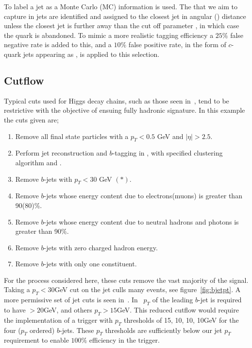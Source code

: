 To label a jet as a  Monte Carlo (MC) information is used.
The  that we aim to capture in jets are identified and
assigned to the closest jet in angular (\distancedeltar{}) distance
unless the closest jet is further away than the cut off parameter \stoppingdeltar{},
in which case the quark is abandoned.
To mimic a more realistic tagging efficiency a
\(25\%\) false negative rate is added to this,
and a \(10\%\) false positive rate, in the form of \(c\)-quark
jets appearing as , is applied to this selection.

\subsection{Cutflow}\label{sec:cutflow}

Typical cuts used for Higgs decay chains,
such as those seen in~\cite{Sirunyan2018alljet},
tend to be restrictive with the objective of 
ensuing fully hadronic signature. 
In this example the cuts given are;
\begin{enumerate}
    \item Remove all final state particles with a $p_T < 0.5$ GeV and $|\eta| > 2.5$.
    \item Perform jet reconstruction and $b$-tagging in \fastjet{} \cite{Cacciari2011FastJet}, with specified clustering algorithm and \stoppingdeltar{}.
    \item Remove $b$-jets with $p_T < 30$ GeV $(*)$.
    \item Remove $b$-jets whose energy content due to electrons(muons) is greater than  90(80)\%.
    \item Remove $b$-jets whose energy content due to neutral hadrons and photons is greater than 90\%.
    \item Remove $b$-jets with zero charged hadron energy.
    \item Remove $b$-jets with only one constituent.
\end{enumerate}

For the process considered here, 
these cuts remove the vast majority of the signal.
Taking a \(p_T < 30\)GeV cut on the jet culls many events,
see figure~\ref{fig:bjetpt}.
A more permissive set of jet cuts is seen in~\cite{Sirunyan2019exotic}.
In~\cite{Sirunyan2019exotic} $p_T$ of the leading $b$-jet is required to have $>20$GeV, and others $p_T > 15$GeV. 
 This reduced cutflow would require the implementation of a trigger with $p_T$ thresholds of 15, 10, 10, 10GeV for the four ($p_T$ ordered) $b$-jets.
 These $p_T$ thresholds are sufficiently below our jet $p_T$ requirement to enable $100\%$ efficiency in the trigger. 


